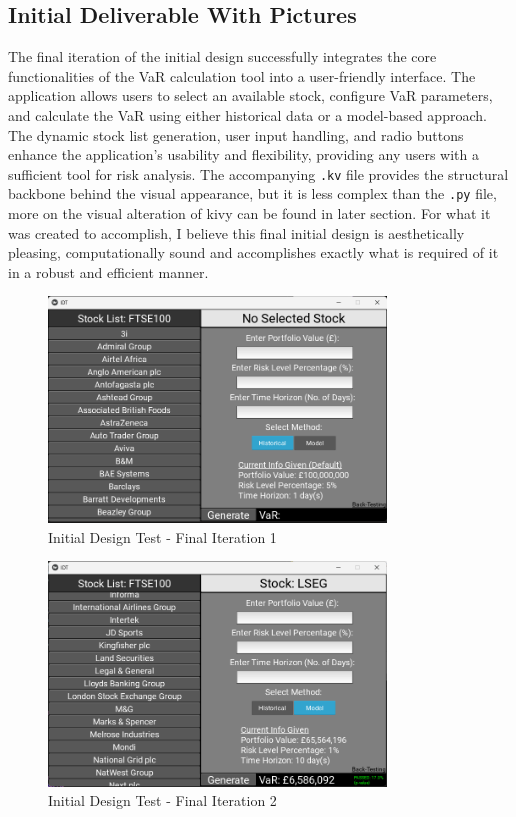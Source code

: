 \documentclass{article}
\begin{document}
\subsection{Initial Deliverable With Pictures}
The final iteration of the initial design successfully integrates the core functionalities of the VaR calculation tool into a user-friendly interface. The application allows users to select an available stock, configure VaR parameters, and calculate the VaR using either historical data or a model-based approach. The dynamic stock list generation, user input handling, and radio buttons enhance the application's usability and flexibility, providing any users with a sufficient tool for risk analysis. The accompanying \texttt{.kv} file provides the structural backbone behind the visual appearance, but it is less complex than the \texttt{.py} file, more on the visual alteration of kivy can be found in later section. For what it was created to accomplish, I believe this final initial design is aesthetically pleasing, computationally sound and accomplishes exactly what is required of it in a robust and efficient manner.\\\vspace{0.3cm}

\begin{figure}[h!]
  \centering
  \includegraphics[width=0.8\textwidth]{Images/Initial Design Tes - Final Iteration 1.png}
  \caption{Initial Design Test - Final Iteration 1}
  \label{fig:Initial Design Test - Final Iteration 1}
\end{figure}

\begin{figure}[h!]
  \centering
  \includegraphics[width=0.8\textwidth]{Images/Initial Design Tes - Final Iteration 2.png}
  \caption{Initial Design Test - Final Iteration 2}
  \label{fig:Initial Design Test - Final Iteration 2}
\end{figure}
\end{document}
